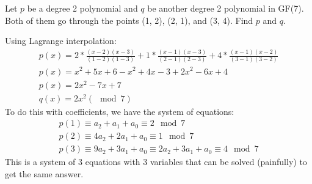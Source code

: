 \question 
Let $p$ be a degree 2 polynomial and $q$ be another degree 2 polynomial in GF(7). Both of them go through the points (1, 2), (2, 1), and (3, 4). Find $p$ and $q$. 

\begin{solution}[1 in]
Using Lagrange interpolation: 
\begin{align*}
	p(x) = 2*\frac{(x-2)(x-3)}{(1-2)(1-3)} + 1*\frac{(x-1)(x-3)}{(2-1)(2-3)} + 4*\frac{(x-1)(x-2)}{(3-1)(3-2)} \\
	p(x)  = x^2 + 5x + 6 - x^2 + 4x - 3 + 2x^2 - 6x + 4 \\
	p(x) = 2x^2 - 7x + 7 \\
	q(x) = 2x^2 (\mod 7)
\end{align*}
To do this with coefficients, we have the system of equations:
\begin{align*}
    p(1) \equiv a_2 + a_1 + a_0 \equiv 2 \mod 7 \\
    p(2) \equiv 4a_2 + 2a_1 + a_0 \equiv 1 \mod 7 \\
    p(3) \equiv 9a_2 + 3a_1 + a_0 \equiv 2a_2 + 3a_1 + a_0 \equiv 4 \mod 7
\end{align*}
This is a system of 3 equations with 3 variables that can be solved (painfully) to get the same answer.
\end{solution}

